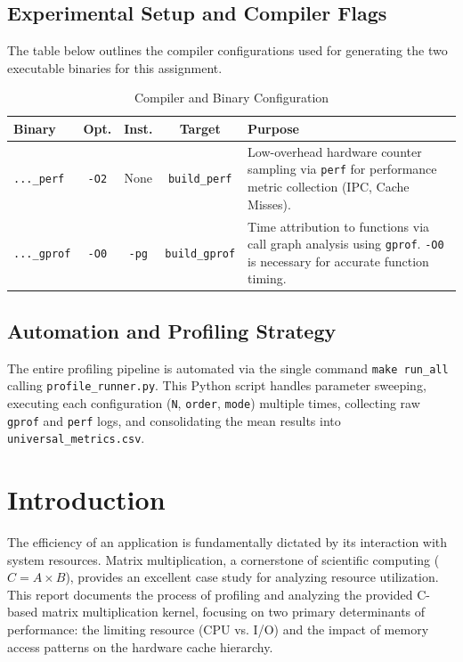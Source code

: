 \documentclass[11pt, a4paper]{article}
\begin{document}
\subsection{Experimental Setup and Compiler Flags}
The table below outlines the compiler configurations used for generating the two executable binaries for this assignment.
\begin{table}[h]
\centering
\caption{Compiler and Binary Configuration}
\label{tab:compiler_config}
\begin{tabularx}{\textwidth}{l c c c X}
\toprule
\textbf{Binary} & \textbf{Opt.} & \textbf{Inst.} & \textbf{Target} & \textbf{Purpose} \\
\midrule
\texttt{...\_perf} & \texttt{-O2} & None & \texttt{build\_perf} & Low-overhead hardware counter sampling via \texttt{perf} for performance metric collection (IPC, Cache Misses). \\
\texttt{...\_gprof} & \texttt{-O0} & \texttt{-pg} & \texttt{build\_gprof} & Time attribution to functions via call graph analysis using \texttt{gprof}. \texttt{-O0} is necessary for accurate function timing. \\
\bottomrule
\end{tabularx}
\end{table}

\subsection{Automation and Profiling Strategy}
The entire profiling pipeline is automated via the single command \texttt{make run\_all} calling \texttt{profile\_runner.py}. This Python script handles parameter sweeping, executing each configuration (\texttt{N}, \texttt{order}, \texttt{mode}) multiple times, collecting raw \texttt{gprof} and \texttt{perf} logs, and consolidating the mean results into \texttt{universal\_metrics.csv}.
\section{Introduction}
The efficiency of an application is fundamentally dictated by its interaction with system resources. Matrix multiplication, a cornerstone of scientific computing ($C=A \times B$), provides an excellent case study for analyzing resource utilization. This report documents the process of profiling and analyzing the provided C-based matrix multiplication kernel, focusing on two primary determinants of performance: the limiting resource (CPU vs. I/O) and the impact of memory access patterns on the hardware cache hierarchy.
\end{document}
